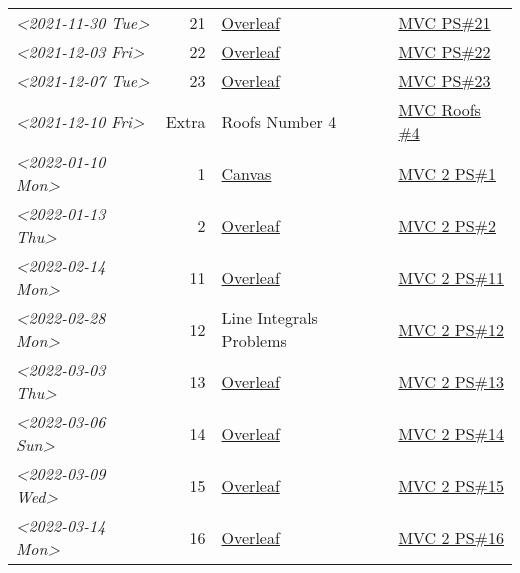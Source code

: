 \documentclass[letterpaper]{article}
\begin{document}
\begin{center}
\begin{tabular}{lrll}
\textit{<2021-11-30 Tue>} & 21 & \href{https://www.overleaf.com/read/ycjqxsjqhrqs}{Overleaf} & \href{../../../src/mathematics/multi_variable_calculus/KBhmvc_ps_21.org}{MVC PS\#21}\\
\textit{<2021-12-03 Fri>} & 22 & \href{https://www.overleaf.com/project/61aa47650d65cd6936cfd852}{Overleaf} & \href{../../../src/mathematics/multi_variable_calculus/KBhmvc_ps_22.org}{MVC PS\#22}\\
\textit{<2021-12-07 Tue>} & 23 & \href{https://www.overleaf.com/project/61ae7329269279ccbccb269f}{Overleaf} & \href{../../../src/mathematics/multi_variable_calculus/KBhmvc_ps_23.org}{MVC PS\#23}\\
\textit{<2021-12-10 Fri>} & Extra & Roofs Number 4 & \href{../../../src/mathematics/multi_variable_calculus/KBhmvc_roofs_4.org}{MVC Roofs \#4}\\
\textit{<2022-01-10 Mon>} & 1 & \href{https://nuevaschool.instructure.com/courses/4135/assignments/65916}{Canvas} & \href{../../../src/mathematics/multi_variable_calculus/KBhmvc_2_ps_1.org}{MVC 2 PS\#1}\\
\textit{<2022-01-13 Thu>} & 2 & \href{https://www.overleaf.com/project/61108fb607d007017107a355}{Overleaf} & \href{../../../src/mathematics/multi_variable_calculus/KBhmvc_2_ps_2.org}{MVC 2 PS\#2}\\
\textit{<2022-02-14 Mon>} & 11 & \href{https://www.overleaf.com/project/62097f19f7ed6fe9dc5a9135}{Overleaf} & \href{../../../src/mathematics/multi_variable_calculus/KBhmvc_2_ps_11.org}{MVC 2 PS\#11}\\
\textit{<2022-02-28 Mon>} & 12 & Line Integrals Problems & \href{../../../src/mathematics/multi_variable_calculus/KBhmvc_2_ps_12.org}{MVC 2 PS\#12}\\
\textit{<2022-03-03 Thu>} & 13 & \href{https://nuevaschool.instructure.com/courses/4135/assignments/68062}{Overleaf} & \href{../../../src/mathematics/multi_variable_calculus/KBhmvc_2_ps_13.org}{MVC 2 PS\#13}\\
\textit{<2022-03-06 Sun>} & 14 & \href{https://www.overleaf.com/project/62256676ec39545fe42c6f44}{Overleaf} & \href{../../../src/mathematics/multi_variable_calculus/KBhmvc_2_ps_14.org}{MVC 2 PS\#14}\\
\textit{<2022-03-09 Wed>} & 15 & \href{https://www.overleaf.com/project/622917862b7a71d63c6cc565}{Overleaf} & \href{../../../src/mathematics/multi_variable_calculus/KBhmvc_2_ps_15.org}{MVC 2 PS\#15}\\
\textit{<2022-03-14 Mon>} & 16 & \href{https://www.overleaf.com/download/project/622b7e5d15c567ea3133597b/build/17f8921448a-60fd58a0f44811ef/output/output.pdf?compileGroup=standard\&clsiserverid=clsi-pre-emp-e2-d-2tg6\&popupDownload=true}{Overleaf} & \href{../../../src/mathematics/multi_variable_calculus/KBhmvc_2_ps_16.org}{MVC 2 PS\#16}\\

\end{tabular}
\end{center}
\end{document}
